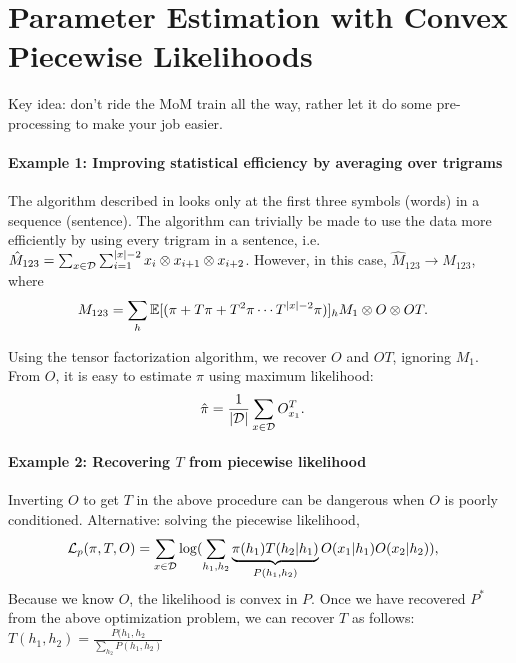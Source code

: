 \section{Parameter Estimation with Convex Piecewise Likelihoods}
\label{sec:piecewise}

Key idea: don't ride the MoM train all the way, rather let it do some pre-processing to make your job easier.

\paragraph{Example 1: Improving statistical efficiency by averaging over trigrams}

The algorithm described in \citet{anandkumar12moments} looks only at the
  first three symbols (words) in a sequence (sentence). 
The algorithm can trivially be made to use the data more efficiently
  by using every trigram in a sentence, i.e. $\hat M_{123}
  = \sum_{x\in\mathcal{D}} \sum_{i = 1}^{|x| - 2} x_{i} \otimes x_{i+1} \otimes
  x_{i+2}$. However, in this case, $\hat M_{123} \to M_{123}$, where 
\begin{align}
  M_{123} &= \sum_{h} \mathbb{E}[(\pi + T \pi + T^2 \pi \cdots T^{|x|-2} \pi)]_h M_1 \otimes O \otimes OT.
\end{align}

Using the tensor factorization algorithm, we recover $O$ and $OT$,
  ignoring $M_1$. From $O$, it is easy to estimate $\pi$ using maximum
  likelihood:
\begin{align}
  \hat \pi &= \frac{1}{|\mathcal{D}|} \sum_{x\in\mathcal{D}} O^T_{x_1}.
\end{align}

\paragraph{Example 2: Recovering $T$ from piecewise likelihood}

Inverting $O$ to get $T$ in the above procedure can be dangerous when $O$ is poorly conditioned. 
Alternative: solving the piecewise likelihood,
\begin{align}
  \mathcal{L}_{p}(\pi, T, O) &= \sum_{x\in\mathcal{D}} \log( \sum_{h_1, h_2} \underbrace{\pi(h_1) T(h_2 | h_1)}_{P(h_1,h_2)} O(x_1 | h_1) O(x_2 | h_2) ),
\end{align}
Because we know $O$, the likelihood is convex in $P$. Once we have recovered $P^*$ from the above optimization problem, we can recover $T$ as follows:
$T(h_1, h_2) = \frac{P(h_1, h_2}{\sum_{h_2} P(h_1, h_2)}$

